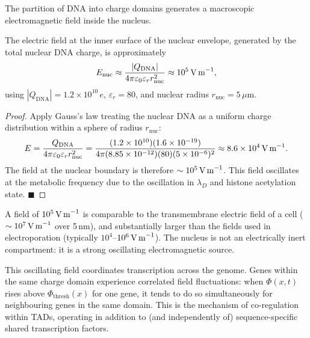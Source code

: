 The partition of DNA into charge domains generates a macroscopic
electromagnetic field inside the nucleus.

\begin{proposition}
\label{prop:nuclear_field}
The electric field at the inner surface of the nuclear envelope, generated by
the total nuclear DNA charge, is approximately
\begin{equation}
  E_{\mathrm{nuc}} \approx \frac{|Q_{\mathrm{DNA}}|}{4\pi\varepsilon_0\varepsilon_r
  r_{\mathrm{nuc}}^2} \approx 10^5\,\text{V\,m}^{-1},
  \label{eq:nuclear_field}
\end{equation}
using $|Q_{\mathrm{DNA}}| = 1.2 \times 10^{10}\,e$, $\varepsilon_r = 80$,
and nuclear radius $r_{\mathrm{nuc}} = 5\,\mu\text{m}$.
\end{proposition}

\begin{proof}
Apply Gauss's law treating the nuclear DNA as a uniform charge distribution
within a sphere of radius $r_{\mathrm{nuc}}$:
\begin{equation}
  E = \frac{Q_{\mathrm{DNA}}}{4\pi\varepsilon_0\varepsilon_r r_{\mathrm{nuc}}^2}
    = \frac{(1.2 \times 10^{10})(1.6 \times 10^{-19})}{4\pi (8.85 \times 10^{-12})(80)(5 \times 10^{-6})^2}
    \approx 8.6 \times 10^4\,\text{V\,m}^{-1}.
\end{equation}
The field at the nuclear boundary is therefore $\sim 10^5\,\text{V\,m}^{-1}$.
This field oscillates at the metabolic frequency due to the oscillation in
$\lambda_D$ and histone acetylation state. $\blacksquare$
\end{proof}

\begin{remark}
A field of $10^5\,\text{V\,m}^{-1}$ is comparable to the transmembrane
electric field of a cell ($\sim 10^7\,\text{V\,m}^{-1}$ over 5\,nm), and
substantially larger than the fields used in electroporation (typically
$10^4$--$10^6\,\text{V\,m}^{-1}$). The nucleus is not an electrically inert
compartment: it is a strong oscillating electromagnetic source.
\end{remark}

This oscillating field coordinates transcription across the genome. Genes
within the same charge domain experience correlated field fluctuations: when
$\Phi(x,t)$ rises above $\Phi_{\mathrm{thresh}}(x)$ for one gene, it tends
to do so simultaneously for neighbouring genes in the same domain. This is the
mechanism of co-regulation within TADs, operating in addition to (and
independently of) sequence-specific shared transcription factors.

